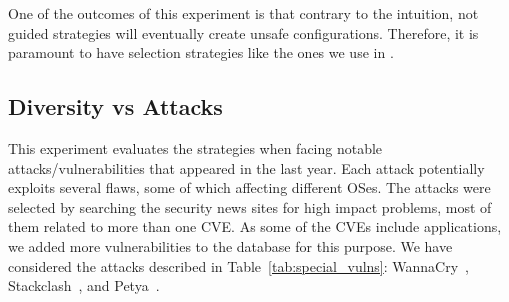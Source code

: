 One of the outcomes of this experiment is that contrary to the intuition, not guided strategies will eventually create unsafe configurations.
Therefore, it is paramount to have selection strategies like the ones we use in \system.

\subsection{Diversity vs Attacks}

This experiment evaluates the strategies when facing notable attacks/vulnerabilities that appeared in the last year. 
Each attack potentially exploits several flaws, some of which affecting different OSes. 
The attacks were selected by searching the security news sites for high impact problems, most of them related to more than one CVE. 
As some of the CVEs include applications, we added more vulnerabilities to the database for this purpose. 
We have considered the attacks described in Table~\ref{tab:special_vulns}: 
WannaCry~\cite{wannacry}, Stackclash~\cite{stacklash}, and Petya~\cite{petya}.


